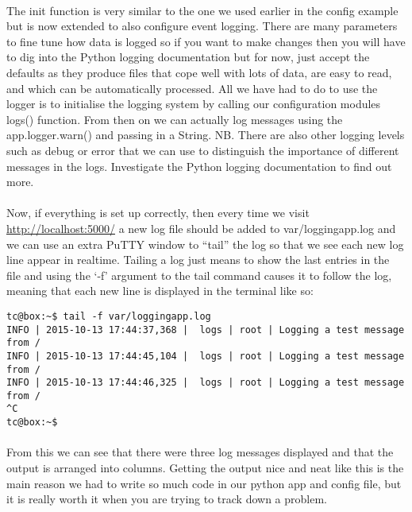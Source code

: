 \documentclass[12pt, a4paper, twoside]{book}
\begin{document}
\paragraph{} The init function is very similar to the one we used earlier in the config example but is now extended to also configure event logging. There are many parameters to fine tune how data is logged so if you want to make changes then you will have to dig into the Python logging documentation but for now, just accept the defaults as they produce files that cope well with lots of data, are easy to read, and which can be automatically processed. All we have had to do to use the logger is to initialise the logging system by calling our configuration modules logs() function. From then on we can actually log messages using the app.logger.warn() and passing in a String. NB. There are also other logging levels such as debug or error that we can use to distinguish the importance of different messages in the logs. Investigate the Python logging documentation to find out more. 

\paragraph{} Now, if everything is set up correctly, then every time we visit \url{http://localhost:5000/} a new log file should be added to var/loggingapp.log and we can use an extra PuTTY window to ``tail'' the log so that we see each new log line appear in realtime. Tailing a log just means to show the last entries in the file and using the `-f' argument to the tail command causes it to follow the log, meaning that each new line is displayed in the terminal like so:

\begin{lstlisting}[style=DOS]
tc@box:~$ tail -f var/loggingapp.log 
INFO | 2015-10-13 17:44:37,368 |  logs | root | Logging a test message from /
INFO | 2015-10-13 17:44:45,104 |  logs | root | Logging a test message from /
INFO | 2015-10-13 17:44:46,325 |  logs | root | Logging a test message from /
^C
tc@box:~$ 
\end{lstlisting}

\paragraph{} From this we can see that there were three log messages displayed and that the output is arranged into columns. Getting the output nice and neat like this is the main reason we had to write so much code in our python app and config file, but it is really worth it when you are trying to track down a problem.
\end{document}

